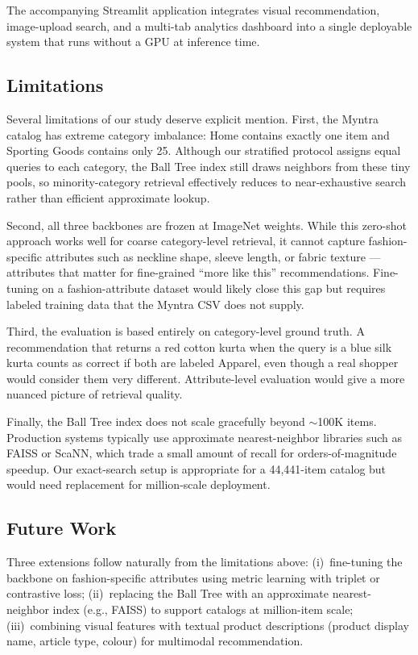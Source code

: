 \documentclass[conference]{IEEEtran}
\begin{document}
The accompanying Streamlit application integrates visual recommendation,
image-upload search, and a multi-tab analytics dashboard into a single
deployable system that runs without a GPU at inference time.

\subsection{Limitations}

Several limitations of our study deserve explicit mention. First, the
Myntra catalog has extreme category imbalance: Home contains exactly
one item and Sporting Goods contains only 25. Although our stratified
protocol assigns equal queries to each category, the Ball Tree index
still draws neighbors from these tiny pools, so minority-category
retrieval effectively reduces to near-exhaustive search rather than
efficient approximate lookup.

Second, all three backbones are frozen at ImageNet weights. While this
zero-shot approach works well for coarse category-level retrieval, it
cannot capture fashion-specific attributes such as neckline shape,
sleeve length, or fabric texture --- attributes that matter for
fine-grained ``more like this'' recommendations. Fine-tuning on a
fashion-attribute dataset would likely close this gap but requires
labeled training data that the Myntra CSV does not supply.

Third, the evaluation is based entirely on category-level ground truth.
A recommendation that returns a red cotton kurta when the query is a
blue silk kurta counts as correct if both are labeled Apparel, even
though a real shopper would consider them very different. Attribute-level
evaluation would give a more nuanced picture of retrieval quality.

Finally, the Ball Tree index does not scale gracefully beyond
$\sim$100K items. Production systems typically use approximate
nearest-neighbor libraries such as FAISS \cite{johnson2019faiss} or
ScaNN, which trade a small amount of recall for orders-of-magnitude
speedup. Our exact-search setup is appropriate for a 44,441-item
catalog but would need replacement for million-scale deployment.

\subsection{Future Work}

Three extensions follow naturally from the limitations above:
(i)~fine-tuning the backbone on fashion-specific attributes using
metric learning with triplet or contrastive loss;
(ii)~replacing the Ball Tree with an approximate nearest-neighbor
index (e.g., FAISS) to support catalogs at million-item scale;
(iii)~combining visual features with textual product descriptions
(product display name, article type, colour) for multimodal
recommendation.
\end{document}

